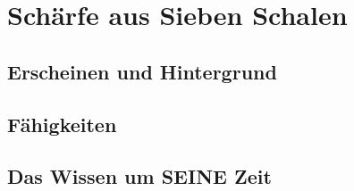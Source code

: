 \section{Schärfe aus Sieben Schalen}

\subsection{Erscheinen und Hintergrund}

\subsection{Fähigkeiten}

\subsection{Das Wissen um SEINE Zeit}